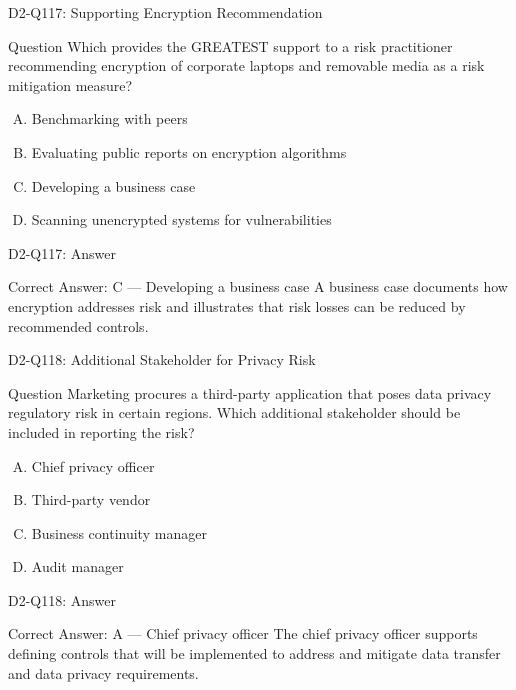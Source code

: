 \documentclass{beamer}
\begin{document}
	\begin{frame}{D2-Q117: Supporting Encryption Recommendation}
		\begin{block}{Question}
			Which provides the GREATEST support to a risk practitioner recommending encryption of corporate laptops and removable media as a risk mitigation measure?
		\end{block}
		\begin{enumerate}[(A)]
			\item Benchmarking with peers
			\item Evaluating public reports on encryption algorithms
			\item Developing a business case
			\item Scanning unencrypted systems for vulnerabilities
		\end{enumerate}
	\end{frame}
	\begin{frame}{D2-Q117: Answer}
		\begin{block}{Correct Answer: C --- Developing a business case}
			A business case documents how encryption addresses risk and illustrates that risk losses can be reduced by recommended controls.
		\end{block}
	\end{frame}
	
	\begin{frame}{D2-Q118: Additional Stakeholder for Privacy Risk}
		\begin{block}{Question}
			Marketing procures a third-party application that poses data privacy regulatory risk in certain regions. Which additional stakeholder should be included in reporting the risk?
		\end{block}
		\begin{enumerate}[(A)]
			\item Chief privacy officer
			\item Third-party vendor
			\item Business continuity manager
			\item Audit manager
		\end{enumerate}
	\end{frame}
	\begin{frame}{D2-Q118: Answer}
		\begin{block}{Correct Answer: A --- Chief privacy officer}
			The chief privacy officer supports defining controls that will be implemented to address and mitigate data transfer and data privacy requirements.
		\end{block}
	\end{frame}
	
\end{document}
